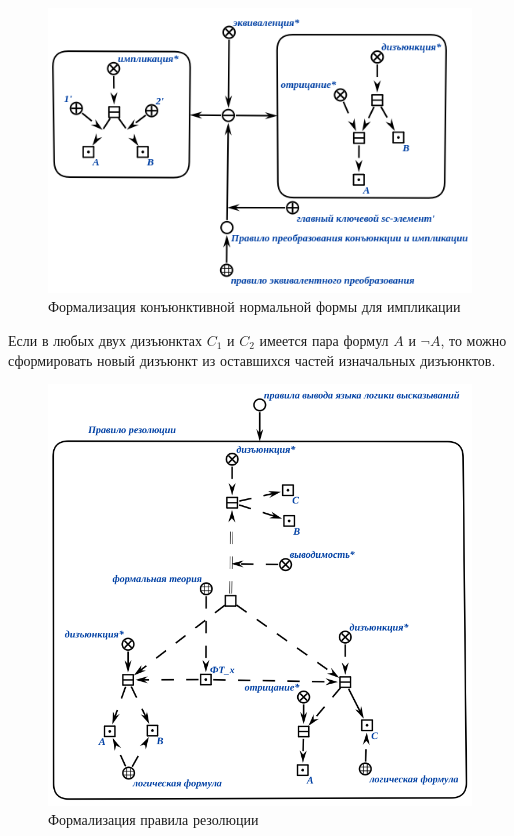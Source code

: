 \begin{figure}[H]
	\includegraphics[scale=0.8]{author/part3/figures/conjunction_implication_rule.png}
	\caption{Формализация конъюнктивной нормальной формы для импликации}
	\label{fig:conjunction_implication_rule}
\end{figure}

Если в любых двух дизъюнктах $C_1$ и $C_2$ имеется пара формул $A$ и $\neg A$, то можно сформировать новый дизъюнкт из оставшихся частей изначальных дизъюнктов.

\begin{figure}[H]
	\includegraphics[scale=0.6]{author/part3/figures/resolution.png}
	\caption{Формализация правила резолюции}
	\label{fig:resolution}
\end{figure}

